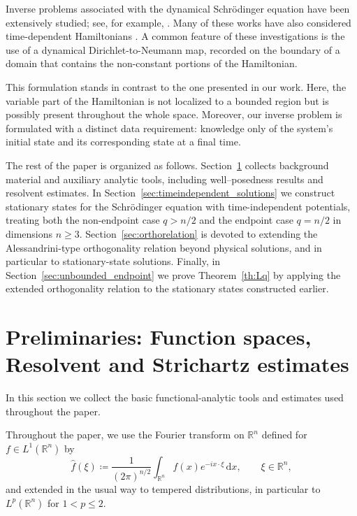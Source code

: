 \documentclass[11pt,a4paper]{amsart}
\theoremstyle{remark}
\theoremstyle{definition}
\newcommand{\R}{\mathbb{R}}
\newcommand{\dd}{\mathrm{d}}
\begin{document}
Inverse problems associated with the dynamical Schrödinger equation have been extensively studied; see, for example, \cites{zbMATH01886353,zbMATH06733553,zbMATH05549395,zbMATH05655673,zbMATH05839237,zbMATH06864429}. Many of these works have also considered time-dependent Hamiltonians \cites{zbMATH06769718,zbMATH06516179,zbMATH05379127,zbMATH07033617,zbMATH07242805}. A common feature of these investigations is the use of a dynamical Dirichlet-to-Neumann map, recorded on the boundary of a domain that contains the non-constant portions of the Hamiltonian. 

This formulation stands in contrast to the one presented in our work. Here, the variable part of the Hamiltonian is not localized to a bounded region but is possibly present throughout the whole space. Moreover, our inverse problem is formulated with a distinct data requirement: knowledge only of the system's initial state and its corresponding state at a final time.

The rest of the paper is organized as follows. Section~\ref{sec:aux} collects background material and auxiliary analytic tools, including well–posedness results and resolvent estimates. In Section~\ref{sec:timeindependent_solutions} we construct stationary states for the Schr\"odinger equation with time-independent potentials, treating both the non-endpoint case $q>n/2$ and the endpoint case $q=n/2$ in dimensions $n\ge3$. Section~\ref{sec:orthorelation} is devoted to extending the Alessandrini-type orthogonality relation beyond physical solutions, and in particular to stationary-state solutions. Finally, in Section~\ref{sec:unbounded_endpoint} we prove Theorem~\ref{th:Lq} by applying the extended orthogonality relation to the stationary states constructed earlier.


\section{Preliminaries: Function spaces, Resolvent and Strichartz  estimates} \label{sec:aux} In this section we collect the basic functional-analytic tools and estimates used throughout the paper.

Throughout the paper, we use the Fourier transform on $\R^n$ defined for $f\in L^1(\R^n)$ by
\[
\widehat f(\xi) \coloneqq \frac{1}{(2\pi)^{n/2}} \int_{\R^n} f(x) e^{-i x\cdot \xi}\, \dd x,
\qquad \xi\in\R^n,
\]
and extended in the usual way to tempered distributions, in particular to $L^p(\R^n)$ for $1<p\le2$.
\end{document}
